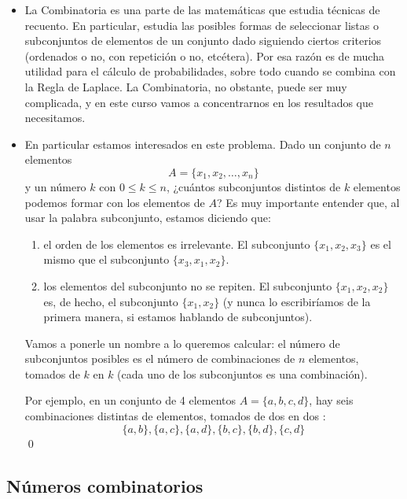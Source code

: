 \begin{itemize}

    \item La Combinatoria es una parte de las matemáticas que estudia técnicas de recuento. En particular, estudia las posibles formas de seleccionar listas o subconjuntos de elementos de un conjunto dado siguiendo ciertos criterios (ordenados o no, con repetición o no, etcétera). Por esa razón es de mucha utilidad para el cálculo de probabilidades, sobre todo cuando se combina con la Regla de Laplace. La Combinatoria, no obstante, puede ser muy complicada, y en este curso vamos a concentrarnos en los resultados que necesitamos.

    \item En particular estamos interesados en este problema. Dado un conjunto de $n$ elementos
    \[A=\{x_1,x_2,\ldots,x_n\}\]
    y un número $k$ con $0\leq k\leq n$, ¿cuántos {\sf subconjuntos distintos} de $k$ elementos podemos formar con los elementos de $A$? Es muy importante entender que, al usar la palabra {\sf subconjunto}, estamos diciendo que:
    \begin{enumerate}
        \item el {\sf orden de los elementos es irrelevante}. El subconjunto $\{x_1,x_2,x_3\}$ es el mismo que el subconjunto $\{x_3,x_1,x_2\}$.
        \item los elementos del subconjunto {\sf no se repiten}. El subconjunto $\{x_1,x_2,x_2\}$ es, de hecho, el subconjunto $\{x_1,x_2\}$ (y nunca lo escribiríamos de la primera manera, si estamos hablando de subconjuntos).
    \end{enumerate}

    Vamos a ponerle un nombre a lo queremos calcular: el número de subconjuntos posibles es el número de {\sf combinaciones de $n$ elementos, tomados de $k$ en $k$} (cada uno de los subconjuntos es una combinación).
    \begin{Ejemplo}\label{ejem:combinacionesCuatroDosEnDos}
    Por ejemplo, en un conjunto de 4 elementos $A=\{a,b,c,d\}$, hay seis combinaciones distintas de elementos, tomados de dos en dos :
    \[\{a,b\},\{a,c\},\{a,d\},\{b,c\},\{b,d\},\{c,d\}\]
    \qed
    \end{Ejemplo}
\end{itemize}

\subsection{Números combinatorios}

